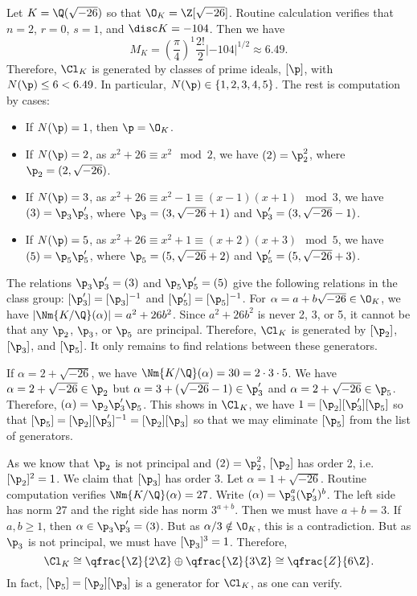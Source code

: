 \begin{ex}
Let $K=\Q(\sqrt{-26})$ so that $\O_K=\Z[\sqrt{-26}]$. Routine calculation verifies that $n=2$, $r=0$, $s=1$, and $\disc K= -104$. Then we have
	\[
	M_K= \left(\dfrac{\pi}{4}\right)^1 \dfrac{2!}{2} |-104|^{1/2} \approx 6.49.
	\]
Therefore, $\Cl_K$ is generated by classes of prime ideals, $[\p]$, with $N(\p) \leq 6<6.49$. In particular, $N(\p) \in \{1,2,3,4,5\}$. The rest is computation by cases:

\begin{itemize}
\item If $N(\p)=1$, then $\p=\O_K$. 
\item If $N(\p)=2$, as $x^2+26 \equiv x^2 \mod 2$, we have $(2)=\p_2^2$, where $\p_2=(2,\sqrt{-26})$. 
\item If $N(\p)=3$, as $x^2+26 \equiv x^2-1 \equiv (x-1)(x+1) \mod 3$, we have $(3)=\p_3\p_3'$, where $\p_3=(3,\sqrt{-26}+1)$ and $\p_3'=(3,\sqrt{-26}-1)$. 
\item If $N(\p)=5$, as $x^2+26 \equiv x^2+1 \equiv (x+2)(x+3) \mod 5$, we have $(5)=\p_5\p_5'$, where $\p_5=(5,\sqrt{-26}+2)$ and $\p_5'=(5,\sqrt{-26}+3)$. 
\end{itemize}

The relations $\p_3\p_3'=(3)$ and $\p_5\p_5'=(5)$ give the following relations in the class group: $[\p_3']=[\p_3]^{-1}$ and $[\p_5']=[\p_5]^{-1}$. For $\alpha=a+b \sqrt{-26} \in \O_K$, we have $|\Nm{K/\Q}(\alpha)|= a^2+26b^2$. Since $a^2+26b^2$ is never 2, 3, or 5, it cannot be that any $\p_2$, $\p_3$, or $\p_5$ are principal. Therefore, $\Cl_K$ is generated by $[\p_2]$, $[\p_3]$, and $[\p_5]$. It only remains to find relations between these generators.

If $\alpha=2+\sqrt{-26}$, we have $\Nm{K/\Q}(\alpha)=30=2 \cdot 3 \cdot 5$. We have $\alpha=2+\sqrt{-26} \in \p_2$ but $\alpha= 3+(\sqrt{-26}-1) \in \p_3'$ and $\alpha=2+\sqrt{-26} \in \p_5$. Therefore, $(\alpha)=\p_2\p_3' \p_5$. This shows in $\Cl_K$, we have $1=[\p_2][\p_3'][\p_5]$ so that $[\p_5]=[\p_2][\p_3']^{-1}=[\p_2][\p_3]$ so that we may eliminate $[\p_5]$ from the list of generators. 


As we know that $\p_2$ is not principal and $(2)=\p_2^2$, $[\p_2]$ has order 2, i.e. $[\p_2]^2=1$. We claim that $[\p_3]$ has order 3. Let $\alpha=1+\sqrt{-26}$. Routine computation verifies $\Nm{K/\Q}(\alpha)=27$. Write $(\alpha)=\p_3^a (\p_3')^b$. The left side has norm 27 and the right side has norm $3^{a+b}$. Then we must have $a+b=3$. If $a,b \geq 1$, then $\alpha \in \p_3\p_3'=(3)$. But as $\alpha/3 \notin \O_K$, this is a contradiction. But as $\p_3$ is not principal, we must have $[\p_3]^3=1$. Therefore,
	\[
	\Cl_K \cong \qfrac{\Z}{2\Z} \oplus \qfrac{\Z}{3\Z} \cong \qfrac{Z}{6\Z}. 
	\] 
In fact, $[\p_5]=[\p_2][\p_3]$ is a generator for $\Cl_K$, as one can verify. \xqed
\end{ex}


